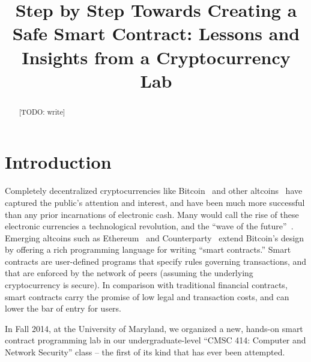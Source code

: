 \documentclass{llncs}
\newcommand{\elaine}[1]{}
\begin{document}
\title{Step by Step Towards Creating a Safe Smart Contract: Lessons and Insights from a Cryptocurrency Lab}

\author{
}

\date{}
\maketitle


\begin{abstract}
[TODO: write]
\end{abstract}

\section{Introduction}

Completely decentralized cryptocurrencies like Bitcoin~\cite{satoshi-bitcoin}
and other altcoins~\cite{altcoins}
have captured the public's attention and interest, 
and have been much more successful than any prior incarnations of electronic
cash. Many would call the rise 
of these electronic currencies a technological revolution, and the ``wave of
the future''~\cite{riseandrise}.
Emerging altcoins such as Ethereum~\cite{ethereum} and Counterparty~\cite{counterparty}
extend Bitcoin's design by offering a rich programming language for 
writing ``smart contracts.'' Smart
contracts are user-defined programs that specify rules 
governing transactions, and that are enforced by
the network of peers (assuming the underlying cryptocurrency is secure). 
In comparison with traditional
financial contracts, smart contracts carry the promise of low legal 
and transaction costs, and can 
lower the bar of entry for users.

In Fall 2014, at the University of Maryland, 
we organized a new, hands-on
smart contract programming lab in 
our undergraduate-level ``CMSC 414: Computer and Network Security'' 
class -- the first of its
kind that has ever been attempted.
\end{document}
